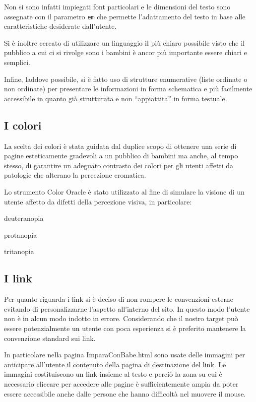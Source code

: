 \documentclass[10pt,a4paper,onecolumn]{article}
\newcommand{\sitepage}[1]{\textsf{#1}}
\begin{document}
Non si sono infatti impiegati font particolari e le dimensioni del testo sono assegnate con il parametro \texttt{em} che permette l'adattamento del testo in base alle caratteristiche desiderate dall'utente.  

Si è inoltre cercato di utilizzare un linguaggio il più chiaro possibile visto che il pubblico a cui ci si rivolge sono i bambini è ancor più importante essere chiari e semplici.

Infine, laddove possibile, si è fatto uso di strutture enumerative (liste ordinate o non ordinate) per presentare le informazioni in forma schematica e più facilmente accessibile in quanto già strutturata e non ``appiattita'' in forma testuale.

\subsection{I colori}
La scelta dei colori è stata guidata dal duplice scopo di ottenere una serie di pagine esteticamente gradevoli a un pubblico di bambini ma anche, al tempo stesso, di garantire un adeguato contrasto dei colori per gli utenti affetti da patologie che alterano la percezione cromatica.

Lo strumento \textsf{Color Oracle} è stato utilizzato al fine di simulare la visione di un utente affetto da difetti della percezione visiva, in particolare:
\begin{description}
  \item{deuteranopia}
  \item{protanopia}
  \item{tritanopia}
\end{description}



\subsection{I link}
Per quanto riguarda i link si è deciso di non rompere le convenzioni esterne evitando di personalizzarne l'aspetto all'interno del sito.
In questo modo l'utente non è in alcun modo indotto in errore. Considerando che il nostro target può essere potenzialmente un utente con poca esperienza si è preferito mantenere la convenzione standard sui link.

In particolare nella pagina \sitepage{ImparaConBabe.html} sono usate delle immagini per anticipare all'utente il contenuto della pagina di destinazione del link.
Le immagini costituiscono un link insieme al testo  e perciò la zona su cui è necessario cliccare per accedere alle pagine è sufficientemente ampia da poter essere accessibile anche dalle persone che hanno difficoltà nel muovere il mouse.
\end{document}
